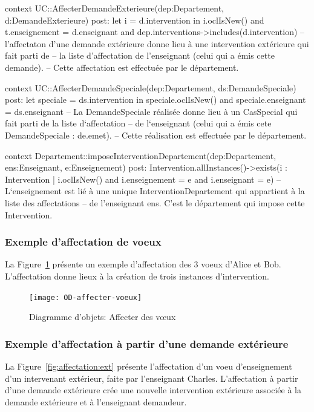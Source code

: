 \begin{ocl}
context UC::AffecterDemandeExterieure(dep:Departement, d:DemandeExterieure)
post: let i = d.intervention in
	i.oclIsNew() and t.enseignement = d.enseignant and
	dep.interventions->includes(d.intervention)
-- l'affectaton d'une demande extérieure donne lieu à une intervention extérieure qui fait parti de 
-- la liste d'affectation de l'enseignant (celui qui a émis cette demande). 
-- Cette affectation est effectuée par le département.

\begin{ocl}
context UC::AffecterDemandeSpeciale(dep:Departement, ds:DemandeSpeciale)
post: let speciale = ds.intervention in
	speciale.oclIsNew() and speciale.enseignant = ds.enseignant
-- La DemandeSpeciale réalisée donne lieu à un CasSpecial qui fait parti de la liste d`affectation 
-- de l`enseignant (celui qui a émis cete DemandeSpeciale : de.emet). 
-- Cette réalisation est effectuée par le  département.
\end{ocl}

\begin{ocl}
context Departement::imposeInterventionDepartement(dep:Departement, ens:Enseignant, e:Enseignement)
post: Intervention.allInstances()->exists(i : Intervention |
	i.oclIsNew() and i.enseignement = e and i.enseignant = e)
-- L`enseignement est lié à une unique InterventionDepartement qui appartient à la liste des affectations 
-- de l'enseignant ens. C'est le département qui impose cette Intervention.
\end{ocl}


\subsubsection{Exemple d'affectation de voeux}
La Figure~\ref{fig:affectation} présente un exemple d'affectation des 3 voeux d'Alice et Bob.
L'affectation donne lieux à la création de trois instances d'intervention.

\begin{figure}[!htbp]
\begin{center}
\texttt{[image: OD-affecter-voeux]}
\caption{Diagramme d'objets: Affecter des vœux}\label{fig:affectation}
\end{center}
\end{figure}

\subsubsection{Exemple d'affectation à partir d'une demande extérieure}
La Figure~\ref{fig:affectation:ext} présente l'affectation d'un voeu d'enseignement d'un intervenant extérieur, faite par l'enseignant Charles.
L'affectation à partir d'une demande extérieure crée une nouvelle intervention extérieure associée à la demande extérieure et à l'enseignant demandeur.


\end{ocl}
